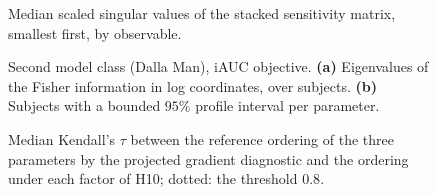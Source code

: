 \begin{figure}[tbp]
\centering
{}
\caption{Median scaled singular values of the stacked sensitivity matrix, smallest first, by observable.}
\label{fig:rank}
\end{figure}

\begin{figure}[tbp]
\centering
{}
\caption{Second model class (Dalla Man), iAUC objective. \textbf{(a)} Eigenvalues of the Fisher information in
log coordinates, over subjects. \textbf{(b)} Subjects with a bounded $95\%$ profile interval per parameter.}
\label{fig:dm}
\end{figure}

\begin{figure}[tbp]
\centering
{}
\caption{Median Kendall's $\tau$ between the reference ordering of the three parameters by the projected
gradient diagnostic and the ordering under each factor of H10; dotted: the threshold $0.8$.}
\label{fig:robustness}
\end{figure}
\FloatBarrier
